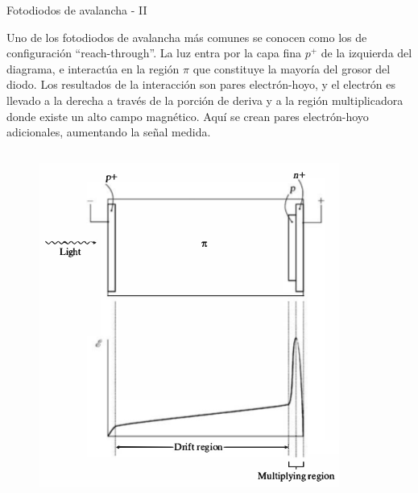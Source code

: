 \documentclass[a4paper,10pt]{beamer}
\begin{document}
\begin{frame}{Fotodiodos de avalancha - II}
\begin{justify}
\footnotesize
 Uno de los fotodiodos de avalancha más comunes se conocen como los de configuración 
 ``reach-through''. La luz entra por la capa fina $p^+$ de la izquierda del diagrama, 
 e interactúa en la región $\pi$ que constituye la mayoría del grosor del diodo. Los 
 resultados de la interacción son pares electrón-hoyo, y el electrón es llevado 
 a la derecha a través de la porción de deriva y a la región multiplicadora donde 
 existe un alto campo magnético. Aquí se crean pares electrón-hoyo adicionales, aumentando 
 la señal medida.
\end{justify} 
 
\begin{columns}[c]
 
 \column{2.1in}
 \begin{figure}
  \center 
  \includegraphics[scale=0.37]{fig41}
 \end{figure}

 \column{2.5in}
 

\end{columns}
\end{frame}
\end{document}
